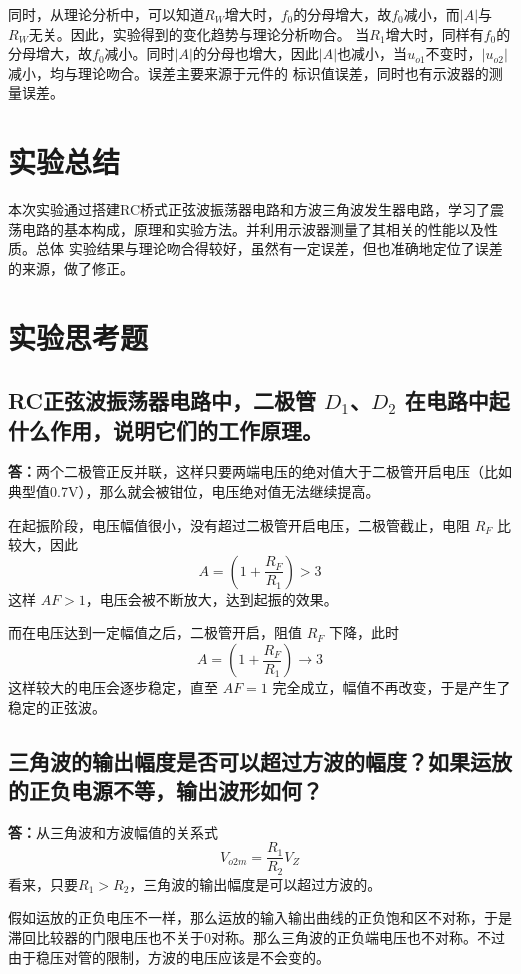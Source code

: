 \documentclass[a4paper,11pt,UTF8]{ctexart}
\newcommand{\p}{\par}
\newcommand{\np}{\par\noindent}
\begin{document}
  同时，从理论分析中，可以知道$R_W$增大时，$f_0$的分母增大，故$f_0$减小，而$|A|$与$R_W$无关。因此，实验得到的变化趋势与理论分析吻合。
  当$R_1$增大时，同样有$f_0$的分母增大，故$f_0$减小。同时$|A|$的分母也增大，因此$|A|$也减小，当$u_{o1}$不变时，$|u_{o2}|$减小，均与理论吻合。误差主要来源于元件的
  标识值误差，同时也有示波器的测量误差。
\section{实验总结}
本次实验通过搭建RC桥式正弦波振荡器电路和方波三角波发生器电路，学习了震荡电路的基本构成，原理和实验方法。并利用示波器测量了其相关的性能以及性质。总体
实验结果与理论吻合得较好，虽然有一定误差，但也准确地定位了误差的来源，做了修正。
\section{实验思考题}
 \subsection{RC正弦波振荡器电路中，二极管 $D_1$、$D_2$ 在电路中起什么作用，说明它们的工作原理。}
 \np \textbf{答：}两个二极管正反并联，这样只要两端电压的绝对值大于二极管开启电压（比如典型值0.7V），那么就会被钳位，电压绝对值无法继续提高。
 \p 在起振阶段，电压幅值很小，没有超过二极管开启电压，二极管截止，电阻 $R_F$ 比较大，因此
 \[ A=\left( 1+\frac{R_F}{R_1} \right)>3 \]
 这样 $AF>1$，电压会被不断放大，达到起振的效果。
 \p 而在电压达到一定幅值之后，二极管开启，阻值 $R_F$ 下降，此时
 \[ A=\left( 1+\frac{R_F}{R_1} \right)\to3 \]
 这样较大的电压会逐步稳定，直至 $AF=1$ 完全成立，幅值不再改变，于是产生了稳定的正弦波。
 \subsection{三角波的输出幅度是否可以超过方波的幅度？如果运放的正负电源不等，输出波形如何？}
 \textbf{答：}从三角波和方波幅值的关系式
 \[ V_{o2m}=\frac{R_1}{R_2}V_Z \]
 看来，只要$R_1>R_2$，三角波的输出幅度是可以超过方波的。
 \p 假如运放的正负电压不一样，那么运放的输入输出曲线的正负饱和区不对称，于是滞回比较器的门限电压也不关于0对称。那么三角波的正负端电压也不对称。不过由于稳压对管的限制，方波的电压应该是不会变的。
\end{document}
